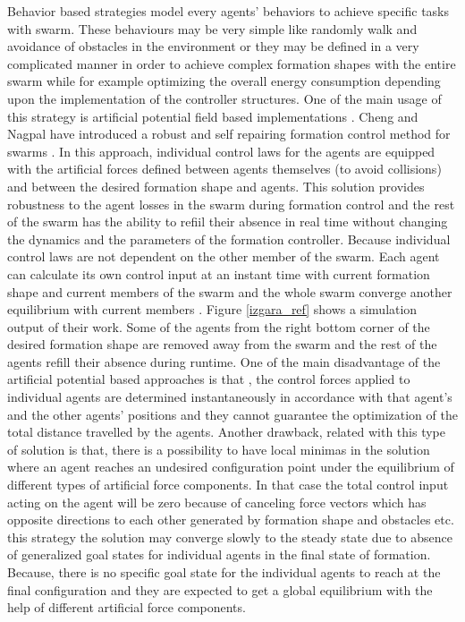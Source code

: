 Behavior based strategies model every agents' behaviors to achieve specific tasks with swarm. These behaviours may be very simple like randomly walk and avoidance of  obstacles in the environment or they may be defined in a very complicated manner in order to achieve complex formation shapes with the entire swarm while for example optimizing the overall energy consumption depending  upon the implementation of the controller structures.  One of the main usage of this strategy is artificial potential field based implementations . Cheng and Nagpal have introduced a robust and self repairing formation control method for swarms \cite{24}. In this approach, individual control laws for the agents are equipped with the artificial forces defined between agents themselves (to avoid collisions) and between the desired formation shape and agents. This solution provides robustness to the agent losses in the swarm during formation control and the rest of the swarm has the ability to refiil their absence in real time without changing the dynamics and the parameters of the formation controller. Because individual control laws are not dependent on the other member of the swarm. Each agent can calculate its own control input at an instant time with current formation shape and current members of the swarm and the whole swarm converge another equilibrium with current members \cite{24}. Figure \ref{izgara_ref} shows a simulation output of their work. Some of the agents from the right bottom corner of the desired formation shape are removed away from the swarm and the rest of the agents refill their absence during runtime. One of the main disadvantage of the artificial potential based approaches is that , the control forces applied to individual agents are determined instantaneously in accordance with that agent's and the other agents' positions and they cannot guarantee the optimization of the total distance travelled by the agents. Another drawback, related with this type of solution is that, there is a possibility to have local minimas in the solution where an agent reaches an undesired configuration point under the equilibrium of different types of artificial force components. In that case the total control input acting on the agent will be zero because of canceling force vectors which has opposite directions to each other generated by formation shape and obstacles etc. this strategy the solution may converge slowly to the steady state due to absence of generalized goal states for individual agents in the final state of formation. Because, there is no specific goal state for the individual agents to reach at the final configuration and they are expected to get a global equilibrium with the help of different artificial force components. 

